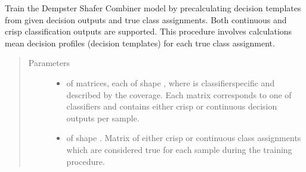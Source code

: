 \documentclass[letterpaper,10pt,english]{sphinxmanual}
\begin{document}
\begin{fulllineitems}
\begin{fulllineitems}
\label{\detokenize{pusion.core.dempster_shafer_combiner:pusion.core.dempster_shafer_combiner.CRDempsterShaferCombiner.train}}
\sphinxAtStartPar
Train the Dempster Shafer Combiner model by precalculating decision templates from given decision outputs and
true class assignments. Both continuous and crisp classification outputs are supported. This procedure involves
calculations mean decision profiles (decision templates) for each true class assignment.
\begin{quote}\begin{description}
\item[{Parameters}] \leavevmode\begin{itemize}
\item {} 
\sphinxAtStartPar
{} \textendash{}  of  matrices, each of shape ,
where  is classifier\sphinxhyphen{}specific and described by the coverage.
Each matrix corresponds to one of  classifiers and contains either crisp or continuous
decision outputs per sample.

\item {} 
\sphinxAtStartPar
{} \textendash{}  of shape .
Matrix of either crisp or continuous class assignments which are considered true for each sample during
the training procedure.

\end{itemize}

\end{description}\end{quote}

\end{fulllineitems}



\end{fulllineitems}
\end{document}
